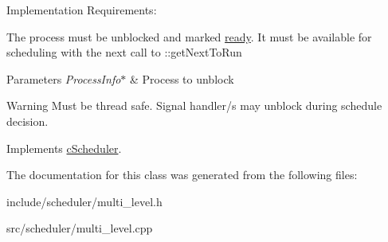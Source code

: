 \-Implementation \-Requirements\-: \begin{DoxyItemize}
\item \-The process must be unblocked and marked \hyperlink{process_8h_a2c72cb00af5be695c1f898162350821fa3d4001ca586c857718be397374082d76}{ready}. \-It must be available for scheduling with the next call to \-::get\-Next\-To\-Run\end{DoxyItemize}

\begin{DoxyParams}{\-Parameters}
{\em \-Process\-Info$\ast$} & \-Process to unblock\\
\hline
\end{DoxyParams}
\begin{DoxyWarning}{\-Warning}
\-Must be thread safe. \-Signal handler/s may unblock during schedule decision. 
\end{DoxyWarning}


\-Implements \hyperlink{classcScheduler_a81fe2e5e5e2334e36db1cbf491e3fa57}{c\-Scheduler}.



\-The documentation for this class was generated from the following files\-:\begin{DoxyCompactItemize}
\item 
include/scheduler/multi\-\_\-level.\-h\item 
src/scheduler/multi\-\_\-level.\-cpp\end{DoxyCompactItemize}
